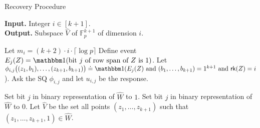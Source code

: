 \begin{algorithm}[H]
	\caption{Recovery Procedure}
	\label{alg:recovery}
	{\bf Input.} Integer $i \in [k+1]$.\\
	{\bf Output.} Subspace $\widehat{V}$ of $\mathbb{F}_p^{k+1}$ of dimension $i$.
	\begin{algorithmic}[1]
         \State Let $m_i = (k+2) \cdot i \cdot \lceil \log p \rceil$
		 \State Define event $E_j(Z) = \ind(\text{bit } j \text{ of row span of } Z \text{ is } 1)$.
		 \State Let $\phi_{i,j} \big((z_1,b_1),\ldots,(z_{k+1},b_{k+1})  \big) \doteq \ind( E_j(Z) \mbox{ and } (b_1,\dots,b_{k+1}) = 1^{k+1}\mbox{ and }\rk(Z) = i$).
		 \State Ask the SQ $\phi_{i,j}$ and let $u_{i,j}$ be the response.
		
		    \State Set bit $j$ in binary representation of $\widehat{W}$ to $1$.
		    \Else
		    \State Set bit $j$ in binary representation of $\widehat{W}$ to $0$.
		    \EndIf
		  \EndFor
		  \State Let $\widehat{V}$ be the set all points $(z_1,\dots,z_{k+1})$ such that $(z_1,\dots,z_{k+1},1) \in \widehat{W}$.
	\end{algorithmic}
\end{algorithm}



